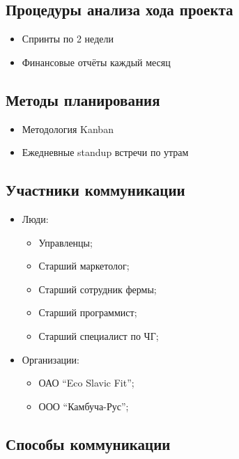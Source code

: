 \documentclass[a4paper,8pt]{article}
\begin{document}
\subsection{Процедуры анализа хода проекта}

    \begin{itemize}
        \item Спринты по 2 недели
        \item Финансовые отчёты каждый месяц
    \end{itemize}

\subsection{Методы планирования}

    \begin{itemize}
        \item Методология Kanban
        \item Ежедневные standup встречи по утрам
    \end{itemize}





\subsection{Участники коммуникации}

    \begin{itemize}
    \item Люди:
        \begin{itemize}
            \item Управленцы;
            \item Старший маркетолог;
            \item Старший сотрудник фермы;
            \item Старший программист;
            \item Старший специалист по ЧГ;
        \end{itemize}
    \item Организации:
        \begin{itemize}
            \item ОАО ``Eco Slavic Fit'';
            \item ООО ``Камбуча-Рус'';
        \end{itemize}
    \end{itemize}

\subsection{Способы коммуникации}
\end{document}
